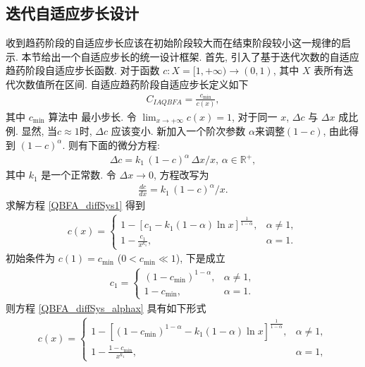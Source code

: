 \subsection{迭代自适应步长设计}
收到趋药阶段的自适应步长应该在初始阶段较大而在结束阶段较小这一规律的启示. 本节给出一个自适应步长的统一设计框架. 
首先, 引入了基于迭代次数的自适应趋药阶段自适应步长函数. 对于函数 $c: X=[1, +\infty) \rightarrow (0,1)$, 其中 $X$ 表所有迭代次数值所在区间. 
自适应趋药阶段自适应步长定义如下
\begin{align}\label{CIAQBFA1}
    C_{IAQBFA}=\frac {c_{\min}}{c(x)},
\end{align}
其中 $c_{\min}$ 算法中 最小步长. 令 $\lim_{x\rightarrow +\infty}c(x)=1$,
对于同一 $x$, $\Delta c$ 与 $\Delta x$ 成比例. 显然, 当$c\approx 1$时, $\Delta c$ 应该变小. 新加入一个阶次参数 $\alpha$来调整$(1-c)$, 由此得到 $(1-c)^\alpha$. 则有下面的微分方程:
\begin{eqnarray}
    \Delta c = k_1\, (1-c)^\alpha\,\Delta x/ x,\,\alpha \in \mathbb R^+,
\end{eqnarray}
其中 $k_1$ 是一个正常数. 令 $\Delta x \rightarrow 0$, 方程改写为
\begin{eqnarray}\label{QBFA_diffSys1}
    \frac{d c}{d x} = k_1\, (1-c)^\alpha/x.
\end{eqnarray}
求解方程 \eqref{QBFA_diffSys1} 得到
\begin{align}\label{QBFA_diffSys_alphax}
  c(x)= \left\{
  \begin{array}{ll}
    1- \left[c_1-k_1(1-\alpha)\ln x \right]^{\frac 1 {1-\alpha}},&  \alpha\neq 1,\\
    1-\frac {c_1} {x^{k_{1}}},&  \alpha= 1.
  \end{array}
  \right.
\end{align}
初始条件为 $c(1)=c_{\min}$ ($0<c_{\min}\ll 1$), 下是成立
\begin{align}
  c_1=\left\{
  \begin{array}{ll}
  (1-c_{\min})^ {1-\alpha},&  \alpha\neq 1,\\
  1-c_{\min},&  \alpha= 1.
  \end{array}
  \right.
\end{align}
则方程 \eqref{QBFA_diffSys_alphax} 具有如下形式
\begin{align}
c(x)=
\left\{
  \begin{array}{ll}
  1- \left[(1-c_{\min})^{{1-\alpha}}-k_1(1-\alpha)\ln x \right]^{\frac 1 {1-\alpha}},&  \alpha\neq 1,\\
  1-\frac{1-c_{\min}} {x^{k_1}},&  \alpha= 1,
  \end{array}
  \right.
\end{align}
